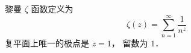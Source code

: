 
\begin{issues}
\issueDraft
\end{issues}


黎曼 $\zeta$ 函数定义为
\begin{equation}
\zeta(z) = \sum_{n=1}^\infty \frac{1}{n^z}
\end{equation}
复平面上唯一的极点是 $z = 1$， 留数为 $1$．
